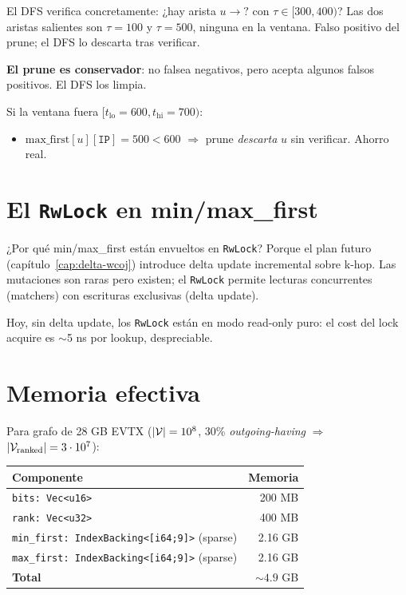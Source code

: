 \begin{ejemplo}
\noindent
El DFS verifica concretamente: ¿hay arista \(u \to ?\) con
\(\tau \in [300, 400)\)? Las dos aristas salientes son \(\tau = 100\)
y \(\tau = 500\), ninguna en la ventana. Falso positivo del
prune; el DFS lo descarta tras verificar.

\textbf{El prune es conservador}: no falsea negativos, pero acepta
algunos falsos positivos. El DFS los limpia.

Si la ventana fuera \([t_{\mathrm{lo}}=600, t_{\mathrm{hi}}=700)\):
\begin{itemize}
    \item \(\mathrm{max\_first}[u][\texttt{IP}] = 500 < 600\) $\Rightarrow$
    prune \emph{descarta} \(u\) sin verificar. Ahorro real.
\end{itemize}
\end{ejemplo}

\section{El \texttt{RwLock} en min/max\_first}

¿Por qué min/max\_first están envueltos en \texttt{RwLock}? Porque
el plan futuro (capítulo~\ref{cap:delta-wcoj}) introduce delta
update incremental sobre k-hop. Las mutaciones son raras pero
existen; el \texttt{RwLock} permite lecturas concurrentes (matchers)
con escrituras exclusivas (delta update).

Hoy, sin delta update, los \texttt{RwLock} están en modo
read-only puro: el cost del lock acquire es $\sim$5 ns por
lookup, despreciable.

\section{Memoria efectiva}

Para grafo de 28 GB EVTX (\(|\mathcal{V}| = 10^8\), 30\%
\emph{outgoing-having} \(\Rightarrow\) \(|\mathcal{V}_{\text{ranked}}| = 3 \cdot
10^7\)):

\begin{center}
\renewcommand{\arraystretch}{1.2}
\begin{tabular}{lr}
\toprule
\textbf{Componente} & \textbf{Memoria} \\
\midrule
\texttt{bits: Vec<u16>} & 200 MB \\
\texttt{rank: Vec<u32>} & 400 MB \\
\texttt{min\_first: IndexBacking<[i64;9]>} (sparse) & 2.16 GB \\
\texttt{max\_first: IndexBacking<[i64;9]>} (sparse) & 2.16 GB \\
\midrule
\textbf{Total} & \(\sim 4.9\) GB \\
\bottomrule
\end{tabular}
\end{center}

